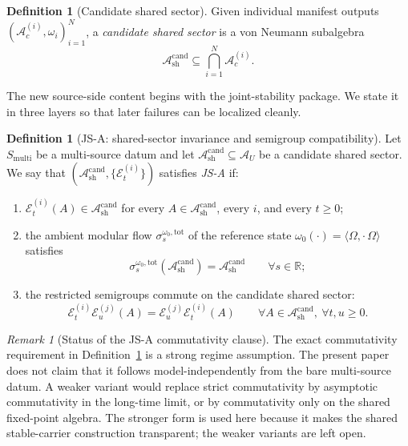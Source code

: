 \documentclass[12pt]{article}
\theoremstyle{definition}
\newtheorem{definition}[theorem]{Definition}
\theoremstyle{remark}
\newtheorem{remark}[theorem]{Remark}
\begin{document}
\begin{definition}[Candidate shared sector]
Given individual manifest outputs
\((\mathcal A_c^{(i)},\omega_i)_{i=1}^N\), a
\emph{candidate shared sector} is a von Neumann subalgebra
\[
\mathcal A_{\mathrm{sh}}^{\mathrm{cand}}
\subseteq
\bigcap_{i=1}^N \mathcal A_c^{(i)}.
\]
\end{definition}

The new source-side content begins with the joint-stability package. We
state it in three layers so that later failures can be localized
cleanly.

\begin{definition}[JS-A: shared-sector invariance and semigroup compatibility]
\label{def:JSA}
Let \(S_{\mathrm{multi}}\) be a multi-source datum and let
\(\mathcal A_{\mathrm{sh}}^{\mathrm{cand}}\subseteq\mathcal A_U\) be a
candidate shared sector. We say that
\((\mathcal A_{\mathrm{sh}}^{\mathrm{cand}},\{\mathcal E_t^{(i)}\})\)
satisfies \emph{JS-A} if:
\begin{enumerate}
\item \(\mathcal E_t^{(i)}(A)\in \mathcal A_{\mathrm{sh}}^{\mathrm{cand}}\)
  for every \(A\in\mathcal A_{\mathrm{sh}}^{\mathrm{cand}}\), every
  \(i\), and every \(t\ge 0\);
\item the ambient modular flow
  \(\sigma_s^{\omega_0,\mathrm{tot}}\) of the reference state
  \(\omega_0(\cdot)=\langle\Omega,\cdot\,\Omega\rangle\) satisfies
  \[
  \sigma_s^{\omega_0,\mathrm{tot}}
  (\mathcal A_{\mathrm{sh}}^{\mathrm{cand}})
  =
  \mathcal A_{\mathrm{sh}}^{\mathrm{cand}}
  \qquad
  \forall s\in\mathbb R;
  \]
\item the restricted semigroups commute on the candidate shared sector:
  \[
  \mathcal E_t^{(i)}\mathcal E_u^{(j)}(A)
  =
  \mathcal E_u^{(j)}\mathcal E_t^{(i)}(A)
  \qquad
  \forall A\in \mathcal A_{\mathrm{sh}}^{\mathrm{cand}},
  \ \forall t,u\ge 0.
  \]
\end{enumerate}
\end{definition}

\begin{remark}[Status of the JS-A commutativity clause]
The exact commutativity requirement in Definition~\ref{def:JSA} is a
strong regime assumption. The present paper does not claim that it
follows model-independently from the bare multi-source datum. A weaker
variant would replace strict commutativity by asymptotic commutativity
in the long-time limit, or by commutativity only on the shared
fixed-point algebra. The stronger form is used here because it makes the
shared stable-carrier construction transparent; the weaker variants are
left open.
\end{remark}
\end{document}

